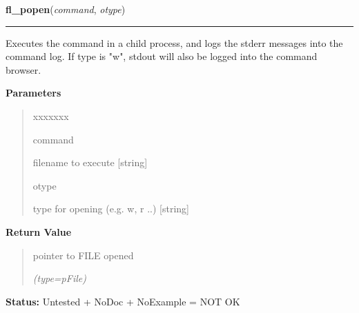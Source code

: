 \hspace{.8\funcindent}\begin{boxedminipage}{\funcwidth}

    \raggedright \textbf{fl\_popen}(\textit{command}, \textit{otype})

    \vspace{-1.5ex}

    \rule{\textwidth}{0.5\fboxrule}
\setlength{\parskip}{2ex}
    Executes the command in a child process, and logs the stderr messages 
    into the command log. If type is "w", stdout will also be logged into 
    the command browser.

\setlength{\parskip}{1ex}
      \textbf{Parameters}
      \vspace{-1ex}

      \begin{quote}
        \begin{Ventry}{xxxxxxx}

          \item[command]

          filename to execute [string]

          \item[otype]

          type for opening (e.g. w, r ..) [string]

        \end{Ventry}

      \end{quote}

      \textbf{Return Value}
    \vspace{-1ex}

      \begin{quote}
      pointer to FILE opened

      {\it (type=pFile)}

      \end{quote}

\textbf{Status:} Untested + NoDoc + NoExample = NOT OK



    \end{boxedminipage}

    \label{xformslib:library:fl_pclose}

    \vspace{0.5ex}

